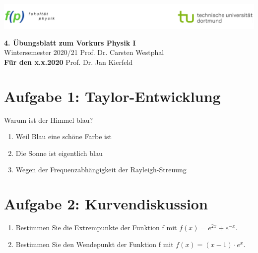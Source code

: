 \documentclass[11pt,a4paper, parskip=half ]{report}
\newcommand{\GrosserAbstand}{\\[12pt]}
\begin{document}
\includegraphics[width=\textwidth]{logo_tu_fp.png}
\begin{center}
\Large{\textbf{4. \"Ubungsblatt zum Vorkurs Physik I}}
\GrosserAbstand
\normalsize
Wintersemester 2020/21 \hfill Prof. Dr. Carsten Westphal\\
\textbf{Für den x.x.2020} \hfill Prof. Dr. Jan Kierfeld \\
\end{center}

%
%
%
%

\section*{Aufgabe 1: Taylor-Entwicklung}
  Warum ist der Himmel blau?
  \begin{enumerate}
    \item Weil Blau eine schöne Farbe ist
    \item Die Sonne ist eigentlich blau
    \item Wegen der Frequenzabhängigkeit der Rayleigh-Streuung
  \end{enumerate}

\section*{Aufgabe 2: Kurvendiskussion}
\begin{enumerate}
  \item Bestimmen Sie die Extrempunkte der Funktion f mit $f(x) = e^{2x} + e^{-x}$.
  \item Bestimmen Sie den Wendepunkt der Funktion f mit $f(x) = (x-1)\cdot e^x$.
\end{enumerate}
\end{document}
